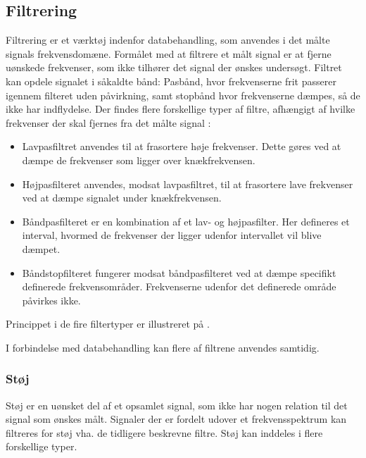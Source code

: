 \subsection{Filtrering}
Filtrering er et værktøj indenfor databehandling, som anvendes i det målte signals frekvensdomæne. Formålet med at filtrere et målt signal er at fjerne uønskede frekvenser, som ikke tilhører det signal der ønskes undersøgt. Filtret kan opdele signalet i såkaldte bånd: Pasbånd, hvor frekvenserne frit passerer igennem filteret uden påvirkning, samt stopbånd hvor frekvenserne dæmpes, så de ikke har indflydelse. 
Der findes flere forskellige typer af filtre, afhængigt af hvilke frekvenser der skal fjernes fra det målte signal \cite{Devasahayam2000}:

\begin{itemize}
	\item Lavpasfiltret anvendes til at frasortere høje frekvenser. Dette gøres ved at dæmpe de frekvenser som ligger over knækfrekvensen.
	\item Højpasfilteret anvendes, modsat lavpasfiltret, til at frasortere lave frekvenser ved at dæmpe signalet under knækfrekvensen.
	\item Båndpasfilteret er en kombination af et lav- og højpasfilter.  Her defineres et interval, hvormed de frekvenser der ligger udenfor intervallet vil blive dæmpet.
	\item Båndstopfilteret fungerer modsat båndpasfilteret ved at dæmpe specifikt definerede frekvensområder. Frekvenserne udenfor det definerede område påvirkes ikke. 
\end{itemize}
  
Princippet i de fire filtertyper er illustreret på .

I forbindelse med databehandling kan flere af filtrene anvendes samtidig. \cite{Devasahayam2000}

\subsubsection{Støj}
Støj er en uønsket del af et opsamlet signal, som ikke har nogen relation til det signal som ønskes målt. Signaler der er fordelt udover et frekvensspektrum kan filtreres for støj vha. de tidligere beskrevne filtre. \cite{Devasahayam2000}
Støj kan inddeles i flere forskellige typer.  
 

% 
 
